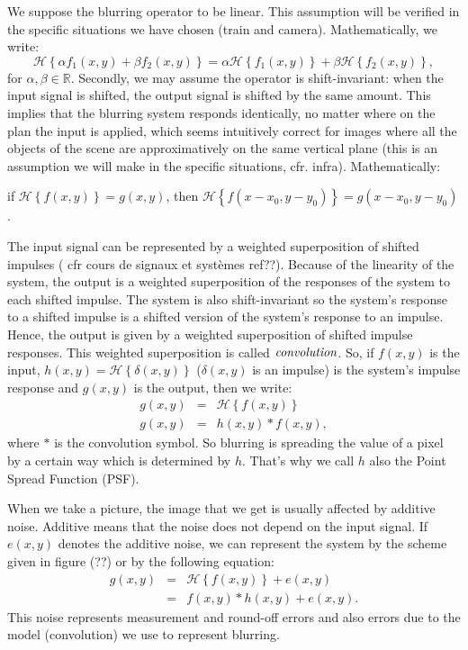 We suppose the blurring operator to be linear. This assumption will be verified in the specific situations we have chosen (train and camera). Mathematically, we write:
\begin{equation}
\mathcal{H}\left\lbrace \alpha f_1(x,y) + \beta f_2(x,y) \right\rbrace =  \alpha \mathcal{H}\left\lbrace f_1(x,y)\right\rbrace + \beta \mathcal{H}\left\lbrace f_2(x,y)\right\rbrace,
\end{equation}
for $\alpha, \beta \in \mathbb{R}$.
Secondly, we may assume the operator is shift-invariant: when the input signal is shifted, the output signal is shifted by the same amount. This implies that the blurring system responds identically, no matter where on the plan the input is applied, which seems intuitively correct for images where all the objects of the scene are approximatively on the same vertical plane (this is an assumption we will make in the specific situations, cfr. infra). Mathematically:

if $\mathcal{H}\left\lbrace f(x,y) \right\rbrace = g(x,y)$, then $\mathcal{H}\left\lbrace f(x-x_0,y-y_0) \right\rbrace = g(x-x_0,y-y_0)$.

The input signal can be represented by a weighted superposition of shifted impulses ( cfr cours de signaux et systèmes ref??). Because of the linearity of the system, the output is a weighted superposition of the responses of the system to each shifted impulse. The system is also shift-invariant so the system's response to a shifted impulse is a shifted version of the system's response to an impulse. Hence, the output is given by a weighted superposition of shifted impulse responses. This weighted superposition is called $\emph{convolution}$. So, if $f(x,y)$ is the input, $h(x,y)=\mathcal{H}\left\lbrace \delta(x,y) \right\rbrace$ ($\delta(x,y)$ is an impulse) is the system's impulse response and $g(x,y)$ is the output, then we write:
\begin{eqnarray}
g(x,y) &=& \mathcal{H}\left\lbrace f(x,y) \right\rbrace \\
g(x,y) &=& h(x,y) \ast f(x,y),
\end{eqnarray}
where $\ast$ is the convolution symbol. So blurring is spreading the value of a pixel by a certain way which is determined by $h$. That's why we call $h$ also the Point Spread Function (PSF).

When we take a picture, the image that we get is usually affected by additive noise. Additive means that the noise does not depend on the input signal. If $e(x,y)$ denotes the additive noise, we can represent the system by the scheme  given in figure (??) or by the following equation:
\begin{eqnarray}
g(x,y) &=& \mathcal{H}\left\lbrace f(x,y) \right\rbrace + e(x,y) \\
 &=& f(x,y) \ast h(x,y) + e(x,y).
\label{generaleq}
\end{eqnarray}
This noise represents measurement and round-off errors and also errors due to the model (convolution) we use to represent blurring. 


